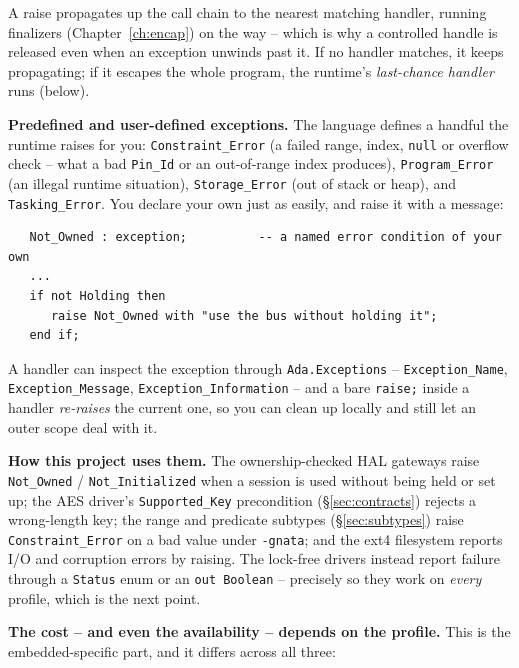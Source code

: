 A raise propagates up the call chain to the nearest matching handler, running
finalizers (Chapter~\ref{ch:encap}) on the way -- which is why a controlled
handle is released even when an exception unwinds past it. If no handler matches,
it keeps propagating; if it escapes the whole program, the runtime's
\emph{last-chance handler} runs (below).

\textbf{Predefined and user-defined exceptions.} The language defines a handful
the runtime raises for you: \texttt{Constraint\_Error} (a failed range, index,
\texttt{null} or overflow check -- what a bad \texttt{Pin\_Id} or an out-of-range
index produces), \texttt{Program\_Error} (an illegal runtime situation),
\texttt{Storage\_Error} (out of stack or heap), and \texttt{Tasking\_Error}. You
declare your own just as easily, and raise it with a message:

\begin{lstlisting}
   Not_Owned : exception;          -- a named error condition of your own
   ...
   if not Holding then
      raise Not_Owned with "use the bus without holding it";
   end if;
\end{lstlisting}

A handler can inspect the exception through \texttt{Ada.Exceptions} --
\texttt{Exception\_Name}, \texttt{Exception\_Message},
\texttt{Exception\_Information} -- and a bare \texttt{raise;} inside a handler
\emph{re-raises} the current one, so you can clean up locally and still let an
outer scope deal with it.

\textbf{How this project uses them.} The ownership-checked HAL gateways raise
\texttt{Not\_Owned} / \texttt{Not\_Initialized} when a session is used without
being held or set up; the AES driver's \texttt{Supported\_Key} precondition
(\S\ref{sec:contracts}) rejects a wrong-length key; the range and predicate
subtypes (\S\ref{sec:subtypes}) raise \texttt{Constraint\_Error} on a bad value
under \texttt{-gnata}; and the ext4 filesystem reports I/O and corruption errors
by raising. The lock-free drivers instead report failure through a \texttt{Status}
enum or an \texttt{out Boolean} -- precisely so they work on \emph{every} profile,
which is the next point.

\textbf{The cost -- and even the availability -- depends on the profile.} This
is the embedded-specific part, and it differs across all three:

